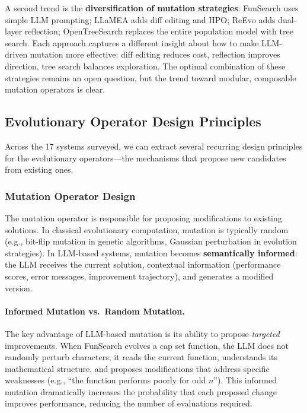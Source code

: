 A second trend is the \textbf{diversification of mutation strategies}: FunSearch uses simple LLM prompting; LLaMEA adds diff editing and HPO; ReEvo adds dual-layer reflection; OpenTreeSearch replaces the entire population model with tree search. Each approach captures a different insight about how to make LLM-driven mutation more effective: diff editing reduces cost, reflection improves direction, tree search balances exploration. The optimal combination of these strategies remains an open question, but the trend toward modular, composable mutation operators is clear.


\subsection{Evolutionary Operator Design Principles}
\label{sec:ch4-operator-design}

Across the 17 systems surveyed, we can extract several recurring design principles for the evolutionary operators---the mechanisms that propose new candidates from existing ones.

\subsubsection{Mutation Operator Design}

The mutation operator is responsible for proposing modifications to existing solutions. In classical evolutionary computation, mutation is typically random (e.g., bit-flip mutation in genetic algorithms, Gaussian perturbation in evolution strategies). In LLM-based systems, mutation becomes \textbf{semantically informed}: the LLM receives the current solution, contextual information (performance scores, error messages, improvement trajectory), and generates a modified version.

\paragraph{Informed Mutation vs.\ Random Mutation.}
The key advantage of LLM-based mutation is its ability to propose \emph{targeted} improvements. When FunSearch evolves a cap set function, the LLM does not randomly perturb characters; it reads the current function, understands its mathematical structure, and proposes modifications that address specific weaknesses (e.g., ``the function performs poorly for odd $n$''). This informed mutation dramatically increases the probability that each proposed change improves performance, reducing the number of evaluations required.


